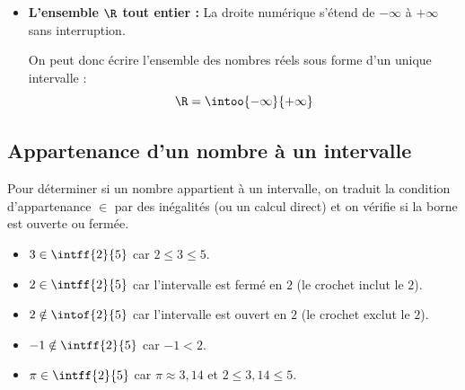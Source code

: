 \begin{remarque}
\begin{itemize}
\begin{itemize}
			      \item \textbf{Intervalle \og{}limité uniquement à droite\fg{} :}

			            L'ensemble des réels $x$ strictement inférieurs à $-1$ s'écrit :

			            \[
				            x < -1 \iff x \in \intoo{-\infty}{-1}
			            \]

			            \begin{center}
			            \end{center}

		      \end{itemize}
		\item \textbf{L'ensemble $\R$ tout entier :} La droite numérique s'étend de $-\infty$ à $+\infty$ sans interruption.

		      On peut donc écrire l'ensemble des nombres réels sous forme d'un unique intervalle :
		      \[
			      \R = \intoo{-\infty}{+\infty}
		      \]

	\end{itemize}
\end{remarque}

\subsection{Appartenance d'un nombre à un intervalle}

\begin{meth}
	Pour déterminer si un nombre appartient à un intervalle, on traduit la condition d'appartenance $\in$ par des inégalités (ou un calcul direct) et on vérifie si la borne est ouverte ou fermée.

	\begin{itemize}
		\item $3 \in \intff{2}{5}$ \quad car \quad $2 \leqslant 3 \leqslant 5$.
		\item $2 \in \intff{2}{5}$ \quad car l'intervalle est fermé en $2$ (le crochet \og{}inclut\fg{} le $2$).
		\item $2 \notin \intof{2}{5}$ \quad car l'intervalle est ouvert en $2$ (le crochet \og{}exclut\fg{} le $2$).
		\item $-1 \notin \intff{2}{5}$ \quad car $-1 < 2$.
		\item $\pi \in \intff{2}{5}$ \quad car $\pi \approx 3{,}14$ et $2 \leqslant 3{,}14 \leqslant 5$.
	\end{itemize}
\end{meth}

